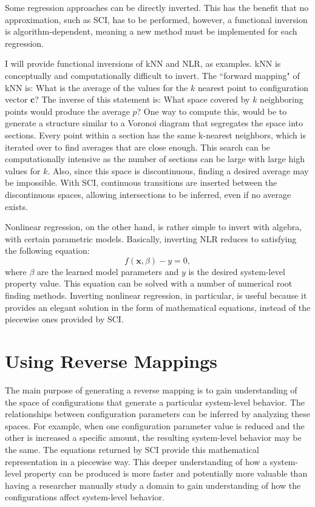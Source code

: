 Some regression approaches can be directly inverted.
This has the benefit that no approximation, such as SCI, has to be performed, however, a functional inversion is algorithm-dependent, meaning a new method must be implemented for each regression.

I will provide functional inversions of kNN and NLR, as examples.
kNN is conceptually and computationally difficult to invert.
The ``forward mapping" of kNN is:
What is the average of the values for the $k$ nearest point to configuration vector $\mathbf c$?
The inverse of this statement is:
What space covered by $k$ neighboring points would produce the average $p$?
One way to compute this, would be to generate a structure similar to a Voronoi diagram that segregates the space into sections.
Every point within a section has the same k-nearest neighbors, which is iterated over to find averages that are close enough.
This search can be computationally intensive as the number of sections can be large with large high values for $k$.
Also, since this space is discontinuous, finding a desired average may be impossible.
With SCI, continuous transitions are inserted between the discontinuous spaces, allowing intersections to be inferred, even if no average exists.

Nonlinear regression, on the other hand, is rather simple to invert with algebra, with certain parametric models.
Basically, inverting NLR reduces to satisfying the following equation:
\[f(\mathbf x, \beta) - y = 0,\]
where $\beta$ are the learned model parameters and $y$ is the desired system-level property value.
This equation can be solved with a number of numerical root finding methods.
Inverting nonlinear regression, in particular, is useful because it provides an elegant solution in the form of mathematical equations, instead of the piecewise ones provided by SCI.


\section{Using Reverse Mappings}
The main purpose of generating a reverse mapping is to gain understanding of the space of configurations that generate a particular system-level behavior.
The relationships between configuration parameters can be inferred by analyzing these spaces.
For example, when one configuration parameter value is reduced and the other is increased a specific amount, the resulting system-level behavior may be the same.
The equations returned by SCI provide this mathematical representation in a piecewise way.
This deeper understanding of how a system-level property can be produced is more faster and potentially more valuable than having a researcher manually study a domain to gain understanding of how the configurations affect system-level behavior.


